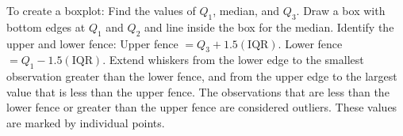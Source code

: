 \ee

\bbox
To create a boxplot:
\bi
\ii Find the values of $Q_1$, median, and $Q_3$.
\ii Draw a box with bottom edges at $Q_1$ and $Q_2$ and line inside the box for the median.
\ii Identify the upper and lower fence:
\bi
\ii[$\circ$] Upper fence $=Q_3 + 1.5(\mbox{IQR})$.
\ii[$\circ$] Lower fence $=Q_1 - 1.5(\mbox{IQR})$.
\ei
\ii Extend whiskers from the lower edge to the smallest observation greater than the lower fence, and from the upper
edge to the largest value that is less than the upper fence.
\ii The observations that are less than the lower fence or greater than the upper fence are considered \alert{outliers}. These values are marked by individual points.
\ei
\ebox

